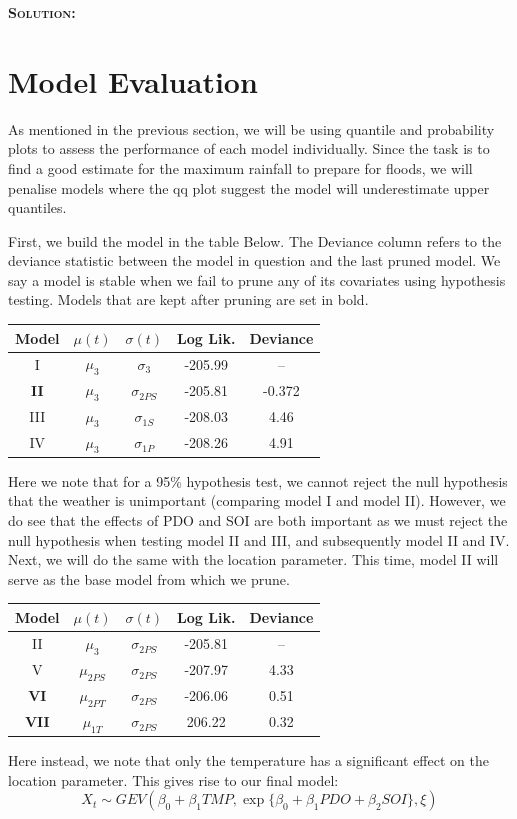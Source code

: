 \documentclass[12pt,oneside]{article}
\newenvironment{solution}
    {\textbf{\textsc{Solution:}}\\}
    {\newpage}
\begin{document}
\begin{solution}
\section*{Model Evaluation}
As mentioned in the previous section, we will be using quantile and probability plots to assess the performance of each model individually. Since the task is to find a good estimate for the maximum rainfall to prepare for floods, we will penalise models where the qq plot suggest the model will underestimate upper quantiles.

\noindent First, we build the model in the table Below. The Deviance column refers to the deviance statistic between the model in question and the last pruned model. We say a model is stable when we fail to prune any of its covariates using hypothesis testing. Models that are kept after pruning are set in bold.
\begin{center}
    \begin{tabular}{||c||c|c|c|c||}\hline
     Model& $\mu(t)$ & $\sigma(t)$&Log Lik.& Deviance \\\hline
     I& $\mu_3$ & $\sigma_3$ & -205.99 & -- \\\hline
     \textbf{II}&$\mu_3$ & $\sigma_{2PS}$ & -205.81 & -0.372  \\\hline
     III& $\mu_3$ & $\sigma_{1S}$ & -208.03 & 4.46\\\hline
     IV& $\mu_3$ & $\sigma_{1P}$ & -208.26 & 4.91 \\\hline
\end{tabular}
\end{center}
Here we note that for a 95\% hypothesis test, we cannot reject the null hypothesis that the weather is unimportant (comparing model I and model II). However, we do see that the effects of PDO and SOI are both important as we must reject the null hypothesis when testing model II and III, and subsequently model II and IV. Next, we will do the same with the location parameter. This time, model II will serve as the base model from which we prune.

\begin{center}
    \begin{tabular}{||c||c|c|c|c||}\hline
     Model& $\mu(t)$ & $\sigma(t)$&Log Lik.& Deviance \\\hline
     II&$\mu_3$ & $\sigma_{2PS}$ & -205.81 & --  \\\hline
     V& $\mu_{2PS}$ & $\sigma_{2PS}$ & -207.97 & 4.33\\\hline
     \textbf{VI}& $\mu_{2PT}$ & $\sigma_{2PS}$ & -206.06 & 0.51 \\\hline
     \textbf{VII}& $\mu_{1T}$ & $\sigma_{2PS}$ &  206.22 & 0.32 \\\hline
\end{tabular}
\end{center}
Here instead, we note that only the temperature has a significant effect on the location parameter. This gives rise to our final model:
\[X_t\sim GEV(\beta_0+\beta_1TMP, \exp\{\beta_0+\beta_1PDO+\beta_2SOI\}, \xi)\]
\end{solution}
\end{document}
